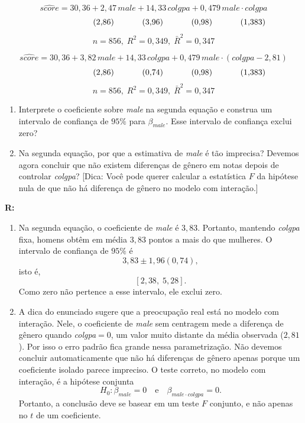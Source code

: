 \documentclass[12pt,letterpaper, onecolumn]{exam}
\renewenvironment{solution}
{\par\noindent\textbf{R:}\enspace\color{blue}}
{\par\color{black}}
\begin{document}
\begin{questions}
\[
\widehat{score} = 30{,}36 + 2{,}47\,male + 14{,}33\,colgpa + 0{,}479\,male \cdot colgpa
\]
\[
\hspace{2.2cm} (2{,}86)\hspace{1.2cm}(3{,}96)\hspace{1.2cm}(0{,}98)\hspace{1.2cm}(1{,}383)
\]
\[
n = 856,\; R^2 = 0{,}349,\; \bar{R}^2 = 0{,}347
\]

\[
\widehat{score} = 30{,}36 + 3{,}82\,male + 14{,}33\,colgpa + 0{,}479\,male \cdot (colgpa - 2{,}81)
\]
\[
\hspace{2.2cm} (2{,}86)\hspace{1.2cm}(0{,}74)\hspace{1.2cm}(0{,}98)\hspace{1.2cm}(1{,}383)
\]
\[
n = 856,\; R^2 = 0{,}349,\; \bar{R}^2 = 0{,}347
\]

\begin{enumerate}[label=(\roman*)]
    \item Interprete o coeficiente sobre \textit{male} na segunda equação e construa um intervalo de confiança de \(95\%\) para \(\beta_{male}\). Esse intervalo de confiança exclui zero?
    \item Na segunda equação, por que a estimativa de \textit{male} é tão imprecisa? Devemos agora concluir que não existem diferenças de gênero em notas depois de controlar \textit{colgpa}? [Dica: Você pode querer calcular a estatística \(F\) da hipótese nula de que não há diferença de gênero no modelo com interação.]
\end{enumerate}

\begin{solution}
\begin{enumerate}[label=(\roman*)]
    \item Na segunda equação, o coeficiente de \textit{male} é \(3{,}83\). Portanto, mantendo \textit{colgpa} fixa, homens obtêm em média \(3{,}83\) pontos a mais do que mulheres. O intervalo de confiança de \(95\%\) é
    \[
    3{,}83 \pm 1{,}96(0{,}74),
    \]
    isto é,
    \[
    [2{,}38,\; 5{,}28].
    \]
    Como zero não pertence a esse intervalo, ele exclui zero.

    \item A dica do enunciado sugere que a preocupação real está no modelo com interação. Nele, o coeficiente de \textit{male} sem centragem mede a diferença de gênero quando \textit{colgpa}\(=0\), um valor muito distante da média observada (\(2{,}81\)). Por isso o erro padrão fica grande nessa parametrização. Não devemos concluir automaticamente que não há diferenças de gênero apenas porque um coeficiente isolado parece impreciso. O teste correto, no modelo com interação, é a hipótese conjunta
    \[
    H_0:\beta_{male}=0 \quad \text{e} \quad \beta_{male\cdot colgpa}=0.
    \]
    Portanto, a conclusão deve se basear em um teste \(F\) conjunto, e não apenas no \(t\) de um coeficiente.
\end{enumerate}
\end{solution}


\end{questions}
\end{document}
